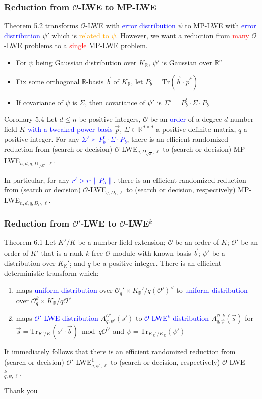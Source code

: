 \documentclass{beamer}
\newcommand{\blue}[1]{\textcolor{blue}{#1}}
\newcommand{\dgreen}[1]{\textcolor{dgreen}{#1}}
\newcommand{\orange}[1]{\textcolor{orange}{#1}}
\newcommand{\red}[1]{\textcolor{red}{#1}}
\newcommand{\cO}{\mathcal{O}}
\newcommand{\bbR}{\mathbb{R}}
\newcommand{\Tr}{\mathrm{Tr}}
\newcommand{\cOV}{\mathcal{O}^{\vee}}
\newcommand{\cOpV}{(\mathcal{O'})^{\vee}}
\newcommand{\KR}{K_{\mathbb{R}}}
\newcommand{\vb}{\vec{b}}
\newcommand{\vp}{\vec{p}}
\newcommand{\vs}{\vec{s}}
\begin{document}
\frame
{
  \frametitle{Reduction from $\cO$-LWE to MP-LWE}
  Theorem 5.2 transforms $\cO$-LWE with \blue{error distribution} $\psi$ to MP-LWE with \blue{error distribution} $\psi'$ which is \orange{related to $\psi$}. However, we want a reduction from \red{many} $\cO$-LWE problems to a \red{single} MP-LWE problem.
  \begin{itemize}
  	\item For $\psi$ being Gaussian distribution over $\KR$, $\psi'$ is Gaussian over $\bbR^n$
  	\item Fix some orthogonal $\bbR$-basis $\vb$ of $\KR$, let $P_b=\Tr(\vb\cdot\vp^t)$
  	\item If covariance of $\psi$ is $\Sigma$, then covariance of $\psi'$ is $\Sigma'=P_b^t\cdot\Sigma\cdot P_b$
  \end{itemize}
  \begin{block}{Corollary 5.4}
  Let $d\leq n$ be positive integers, $\cO$ be an \blue{order} of a degree-$d$ number field $K$ \blue{with a tweaked power basis} $\vp$, $\Sigma\in\bbR^{d\times d}$ a positive definite matrix, $q$ a positive integer. For any \blue{$\Sigma'\succ P_b^t\cdot\Sigma\cdot P_b$}, there is an \dgreen{efficient randomized reduction} from (search or decision) $\cO$-LWE$_{q,D_{\sqrt{\Sigma}},\ell}$ to (search or decision) MP-LWE$_{n,d,q,D_{\sqrt{\Sigma'}},\ell}$.

  In particular, for any \blue{$r'>r\cdot\|P_b\|$}, there is an \dgreen{efficient randomized reduction} from (search or decision) $\cO$-LWE$_{q,D_r,\ell}$ to (search or decision, respectively) MP-LWE$_{n,d,q,D_{r'},\ell}$.
  \end{block}
}

\frame
{
  \frametitle{Reduction from $\cO'$-LWE to $\cO$-LWE$^k$}
  \begin{block}{Theorem 6.1}
  Let $K'/K$ be a number field extension; $\cO$ be an order of $K$; $\cO'$ be an order of $K'$ that is a rank-$k$ free $\cO$-module with known basis $\vb$; $\psi'$ be a distribution over $\KR'$; and $q$ be a positive integer. There is an \dgreen{efficient deterministic transform} which:
	\begin{enumerate}
		\item maps \blue{uniform distribution} over $\cO_q'\times\KR'/q\cOpV$ to \blue{uniform distribution} over $\cO_q^k\times\KR/q\cOV$
		\item maps \blue{$\cO'$-LWE distribution} $A_{q,\psi'}^{\cO'}(s')$ to \blue{$\cO$-LWE$^k$ distribution} $A_{q,\psi}^{\cO,k}(\vs)$ for $\vs=\Tr_{K'/K}(s'\cdot\vb)\bmod q\cOV$ and $\psi=\Tr_{\KR'/\KR}(\psi')$
	\end{enumerate}
	It immediately follows that there is an \dgreen{efficient randomized reduction} from (search or decision) $\cO'$-LWE$_{q,\psi',\ell}^1$ to (search or decision, respectively) $\cO$-LWE$_{q,\psi,\ell}^k$.
  \end{block}

}

\frame
{
	\Huge\center Thank you
}
\end{document}
